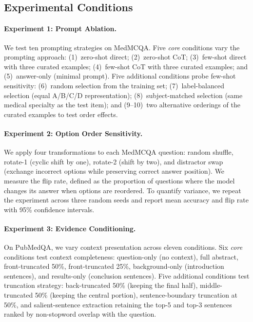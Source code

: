 \documentclass[runningheads,a4paper]{llncs}
\begin{document}
\subsection{Experimental Conditions}

\paragraph{Experiment 1: Prompt Ablation.}
We test ten prompting strategies on MedMCQA. Five \textit{core} conditions vary the prompting approach: (1)~zero-shot direct; (2)~zero-shot CoT; (3)~few-shot direct with three curated examples; (4)~few-shot CoT with three curated examples; and (5)~answer-only (minimal prompt). Five additional conditions probe few-shot sensitivity: (6)~random selection from the training set; (7)~label-balanced selection (equal A/B/C/D representation); (8)~subject-matched selection (same medical specialty as the test item); and (9--10)~two alternative orderings of the curated examples to test order effects.

\paragraph{Experiment 2: Option Order Sensitivity.}
We apply four transformations to each MedMCQA question: random shuffle, rotate-1 (cyclic shift by one), rotate-2 (shift by two), and distractor swap (exchange incorrect options while preserving correct answer position). We measure the flip rate, defined as the proportion of questions where the model changes its answer when options are reordered. To quantify variance, we repeat the experiment across three random seeds and report mean accuracy and flip rate with 95\% confidence intervals.

\paragraph{Experiment 3: Evidence Conditioning.}
On PubMedQA, we vary context presentation across eleven conditions. Six \textit{core} conditions test context completeness: question-only (no context), full abstract, front-truncated 50\%, front-truncated 25\%, background-only (introduction sentences), and results-only (conclusion sentences). Five additional conditions test truncation strategy: back-truncated 50\% (keeping the final half), middle-truncated 50\% (keeping the central portion), sentence-boundary truncation at 50\%, and salient-sentence extraction retaining the top-5 and top-3 sentences ranked by non-stopword overlap with the question.
\end{document}
